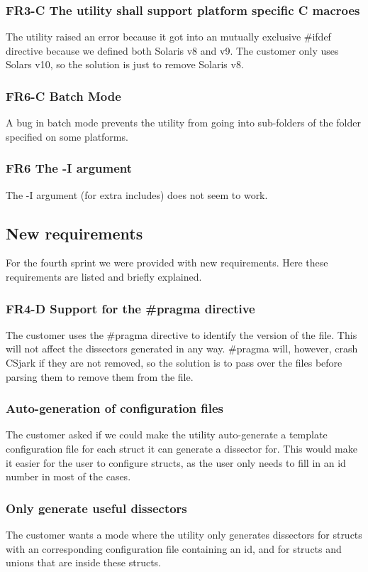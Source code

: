 \subsubsection{FR3-C The utility shall support platform specific C macroes}
The utility raised an error because it got into an mutually exclusive \#ifdef directive because we defined both Solaris v8 and v9. The customer only uses Solars v10, so the solution is just to remove Solaris v8.
\subsubsection{FR6-C Batch Mode}
A bug in batch mode prevents the utility from going into sub-folders of the folder specified on some platforms.
\subsubsection{FR6 The -I argument}
The -I argument (for extra includes) does not seem to work.

\subsection{New requirements}
For the fourth sprint we were provided with new requirements. Here these requirements are listed and briefly explained. 
\subsubsection{FR4-D Support for the \#pragma directive}
The customer uses the \#pragma directive to identify the version of the file. This will not affect the dissectors generated in any way. \#pragma will, however, crash CSjark if they are not removed, so the solution is to pass over the files before parsing them to remove them from the file.
\subsubsection{Auto-generation of configuration files}
The customer asked if we could make the utility auto-generate a template configuration file for each struct it can generate a dissector for. This would make it easier for the user to configure structs, as the user only needs to fill in an id number in most of the cases.
\subsubsection{Only generate useful dissectors}
The customer wants a mode where the utility only generates dissectors for structs with an corresponding configuration file containing an id, and for structs and unions that are inside these structs.
